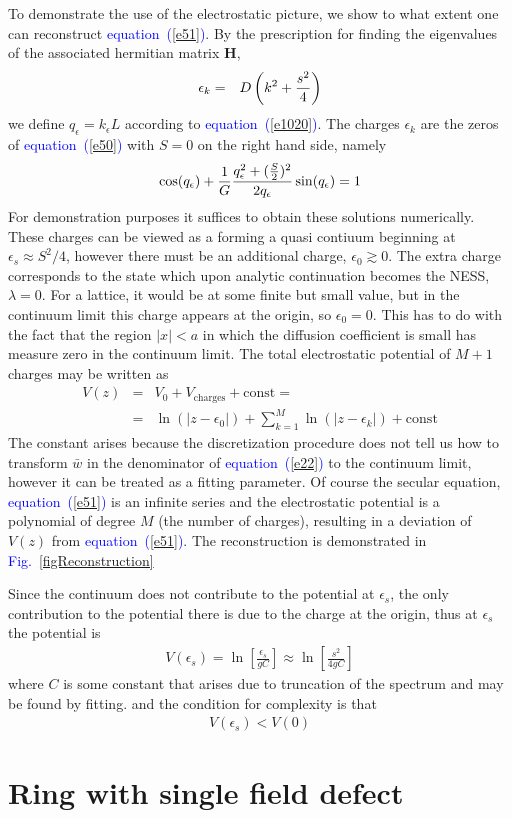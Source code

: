 \documentclass[aps,pre,floats,floatfix,twocolumn]{revtex4}
\newcommand{\const}{\mbox{const}}
\newcommand{\be}[1]{\begin{eqnarray}\ifthenelse{#1=-1}{\nonumber}{\ifthenelse{#1=0}{}{\label{e#1}}}}
\newcommand{\beq}{\begin{eqnarray}}
\newcommand{\eeq}{\end{eqnarray}}
\newcommand{\Eq}[1]{\textcolor{blue}{{equation}\!~(\ref{#1})}}
\newcommand{\Fig}[1]{\textcolor{blue}{Fig.}\!\!~\ref{#1}}
\begin{document}
To demonstrate the use of the electrostatic picture, we show to what extent one can reconstruct \Eq{e51}. 
By the prescription for finding the eigenvalues of the associated hermitian matrix $\bm{H}$, 
%
\be{1020}
\epsilon_k &=& D\left(k^2+\frac{s^2}{4}\right)
\eeq
%
we define $q_{\epsilon} = k_{\epsilon}L$ according to \Eq{e1020}.
The charges $\epsilon_k$ are the zeros of \Eq{e50} with $S=0$ on the right hand side, namely
%
\be{1021}
 \cos(q_{\epsilon}) + \frac{1}{G} \frac{q_{\epsilon}^2+(\frac{S}{2})^2}{2q_{\epsilon}}\sin(q_{\epsilon})= 1
\eeq
%
For demonstration purposes it suffices to obtain these solutions numerically.
These charges can be viewed as a forming a quasi contiuum beginning at $\epsilon_s \approx S^2/4$, 
however there must be an additional charge, $\epsilon_0 \gtrsim 0$. 
The extra charge corresponds to the state which upon analytic continuation becomes the NESS, $\lambda = 0$.
For a lattice, it would be at some finite but small value, but in the continuum limit this charge appears at the origin, so $\epsilon_0=0$.
This has to do with the fact that the region $|x|<a$ in which the diffusion coefficient is small has measure zero in the continuum limit.
The total electrostatic potential of $M+1$ charges may be written as
%
\beq
V(z) &=& V_0 + V_{\text{charges}} + \const = \\
&=& \ln(|z-\epsilon_0|) + \sum_{k=1}^M \ln(|z-\epsilon_k|) + \const
\eeq
% 
The constant arises because the discretization procedure does not tell us how to transform 
$\bar{w}$ in the denominator of \Eq{e22} to the continuum limit, however
it can be treated as a fitting parameter. Of course the secular equation, \Eq{e51} is an infinite series 
and the electrostatic potential is a polynomial of degree $M$ (the number of charges), resulting in a deviation of $V(z)$ from
\Eq{e51}. The reconstruction is demonstrated in \Fig{figReconstruction} 

Since the continuum does not contribute to the potential at $\epsilon_s$, 
the only contribution to the potential there is due to the charge at the origin, 
thus at $\epsilon_s$ the potential is
%
\beq
V(\epsilon_s) = \ln \left[\frac{\epsilon_s}{gC}\right] \approx  \ln \left[\frac{s^2}{4gC}\right] 
\eeq
%
where $C$ is some constant that arises due to truncation of the spectrum and may be found by fitting.
and the condition for complexity is that 
%
\beq
V(\epsilon_s) < V(0)
\eeq



\section{Ring with single field defect}
\label{A8}
\end{document}
